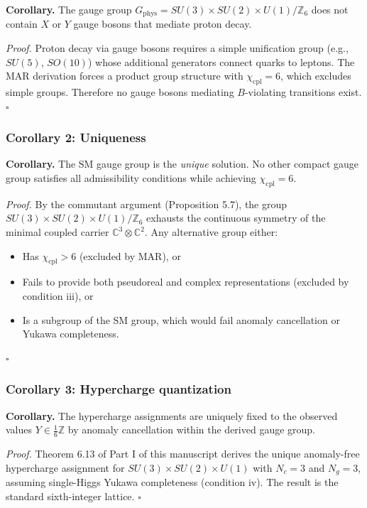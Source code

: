 \textbf{Corollary.} The gauge group \(G_{\mathrm{phys}} = SU(3) \times SU(2) \times U(1)/\mathbb{Z}_6\) does not contain \(X\) or \(Y\) gauge bosons that mediate proton decay.

\emph{Proof.} Proton decay via gauge bosons requires a simple unification group (e.g., \(SU(5)\), \(SO(10)\)) whose additional generators connect quarks to leptons. The MAR derivation forces a product group structure with \(\chi_{\mathrm{cpl}} = 6\), which excludes simple groups. Therefore no gauge bosons mediating \(B\)-violating transitions exist. \(\square\)

\subsubsection{Corollary 2: Uniqueness}\label{corollary-2-uniqueness}

\textbf{Corollary.} The SM gauge group is the \emph{unique} solution. No other compact gauge group satisfies all admissibility conditions while achieving \(\chi_{\mathrm{cpl}} = 6\).

\emph{Proof.} By the commutant argument (Proposition 5.7), the group \(SU(3) \times SU(2) \times U(1)/\mathbb{Z}_6\) exhausts the continuous symmetry of the minimal coupled carrier \(\mathbb{C}^3 \otimes \mathbb{C}^2\). Any alternative group either:

\begin{itemize}
\tightlist
\item
  Has \(\chi_{\mathrm{cpl}} > 6\) (excluded by MAR), or
\item
  Fails to provide both pseudoreal and complex representations (excluded by condition iii), or
\item
  Is a subgroup of the SM group, which would fail anomaly cancellation or Yukawa completeness.
\end{itemize}

\(\square\)

\subsubsection{Corollary 3: Hypercharge quantization}\label{corollary-3-hypercharge-quantization}

\textbf{Corollary.} The hypercharge assignments are uniquely fixed to the observed values \(Y \in \frac{1}{6}\mathbb{Z}\) by anomaly cancellation within the derived gauge group.

\emph{Proof.} Theorem 6.13 of Part I of this manuscript derives the unique anomaly-free hypercharge assignment for \(SU(3) \times SU(2) \times U(1)\) with \(N_c = 3\) and \(N_g = 3\), assuming single-Higgs Yukawa completeness (condition iv). The result is the standard sixth-integer lattice. \(\square\)

